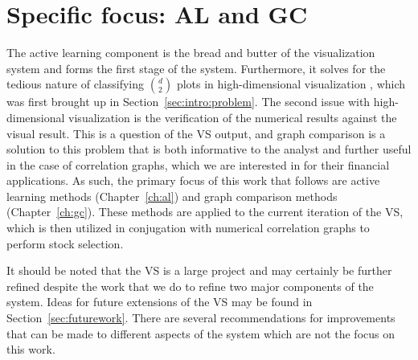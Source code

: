 \section{Specific focus: AL and GC}
\label{sec:visualizer:focus}

The active learning component is the bread and butter of the visualization 
system and forms the first stage of the system. Furthermore, it solves for the 
tedious nature of classifying $d \choose 2$ plots in high-dimensional 
visualization , which was first brought up in Section~\ref{sec:intro:problem}. 
The second issue with high-dimensional visualization is the verification of the 
numerical results against the visual result. This is a question of the VS 
output, and graph comparison is a solution to this problem that is both 
informative to the analyst and further useful in the case of correlation 
graphs, which we are interested in for their financial applications. As such, 
the primary focus of this work that follows are active learning methods 
(Chapter~\ref{ch:al}) and graph comparison methods (Chapter~\ref{ch:gc}). These 
methods are applied to the current iteration of the VS, which is then utilized 
in conjugation with numerical correlation graphs to perform stock selection.

It should be noted that the VS is a large project and may certainly be further 
refined despite the work that we do to refine two major components of the 
system. Ideas for future extensions of the VS may be found in 
Section~\ref{sec:futurework}. There are several recommendations for 
improvements that can be made to different aspects of the system which are not 
the focus on this work.